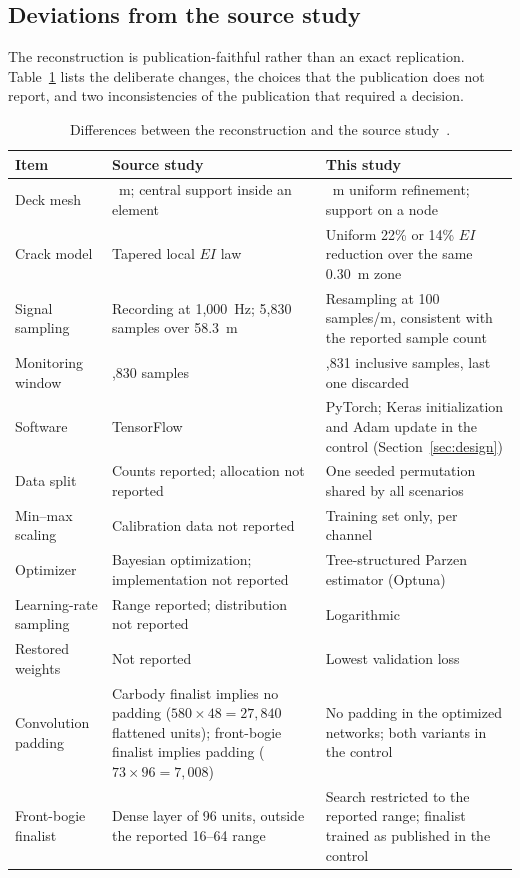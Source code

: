 \subsection{Deviations from the source study}
\label{sec:deviations}

The reconstruction is publication-faithful rather than an exact replication.
Table~\ref{tab:f25_deviations} lists the deliberate changes, the choices that
the publication does not report, and two inconsistencies of the publication
that required a decision.

\begin{table}[htbp]
\centering
\caption{Differences between the reconstruction and the source
study~\cite{fernandes2025early}.}
\label{tab:f25_deviations}
\small
\begin{tabular}{@{}>{\raggedright\arraybackslash}p{}
>{\raggedright\arraybackslash}p{}
>{\raggedright\arraybackslash}p{}@{}}
\toprule
Item & Source study & This study \\
\midrule
Deck mesh & 0.30~m; central support inside an element & 0.15~m uniform refinement; support on a node \\
Crack model & Tapered local $EI$ law~\cite{sinha2002simplified} & Uniform 22\% or 14\% $EI$ reduction over the same 0.30~m zone \\
Signal sampling & Recording at 1,000~Hz; 5,830 samples over 58.3~m & Resampling at 100 samples/m, consistent with the reported sample count \\
Monitoring window & 5,830 samples & 5,831 inclusive samples, last one discarded \\
Software & TensorFlow & PyTorch; Keras initialization and Adam update in the control (Section~\ref{sec:design}) \\
Data split & Counts reported; allocation not reported & One seeded permutation shared by all scenarios \\
Min--max scaling & Calibration data not reported & Training set only, per channel \\
Optimizer & Bayesian optimization; implementation not reported & Tree-structured Parzen estimator (Optuna) \\
Learning-rate sampling & Range reported; distribution not reported & Logarithmic \\
Restored weights & Not reported & Lowest validation loss \\
Convolution padding & Carbody finalist implies no padding ($580\times48=27{,}840$ flattened units); front-bogie finalist implies padding ($73\times96=7{,}008$) & No padding in the optimized networks; both variants in the control \\
Front-bogie finalist & Dense layer of 96 units, outside the reported 16--64 range & Search restricted to the reported range; finalist trained as published in the control \\
\bottomrule
\end{tabular}
\end{table}

